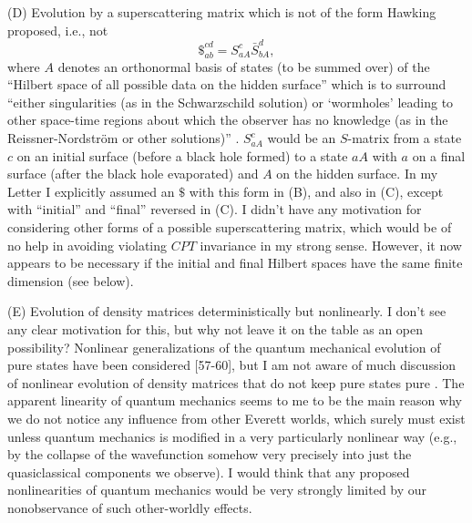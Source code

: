      (D) Evolution by a superscattering matrix which is not of the
form Hawking
proposed, i.e., not
     	\begin{equation}
	\$_{ab}^{cd} = S_{aA}^c \bar{S}_{bA}^d,
	\end{equation}
where $A$ denotes an orthonormal basis of states (to be summed over)
of the
``Hilbert space of all possible data on the hidden surface'' which is
to
surround ``either singularities (as in the Schwarzschild solution) or
`wormholes' leading to other space-time regions about which the
observer has no
knowledge (as in the Reissner-Nordstr\"{o}m or other solutions)''
\cite{Haw76}.
$S_{aA}^c$ would be an $S$-matrix from a state $c$ on an initial
surface
(before a black hole formed) to a state $aA$ with $a$ on a final
surface (after
the black hole evaporated) and $A$ on the hidden surface.  In my
Letter I
explicitly assumed  an $\$$ with this form in (B), and also in (C),
except with
``initial'' and ``final'' reversed in (C).  I didn't have any
motivation for
considering other forms of a possible superscattering matrix, which
would be of
no help in avoiding violating $CPT$ invariance in my strong sense.
However,
it now appears to be necessary if the initial and final Hilbert
spaces have the
same finite dimension (see below).

     (E) Evolution of density matrices deterministically but
nonlinearly.
I don't see any clear motivation for this, but why not leave it on
the table as
an open possibility?  Nonlinear generalizations of the quantum
mechanical
evolution of pure states have been considered [57-60],
but I am not aware of much discussion of nonlinear evolution of
density
matrices that do not keep pure states pure \cite{PreSB}.
The apparent linearity of quantum mechanics
seems to me to be the main reason why we do not notice any influence
from
other Everett worlds, which surely must exist unless quantum
mechanics is
modified in a very particularly nonlinear way (e.g., by the collapse
of the
wavefunction somehow very precisely into just the quasiclassical
components
we observe).  I would think that any proposed nonlinearities of
quantum
mechanics would be very strongly limited by our nonobservance of such
other-worldly effects.

